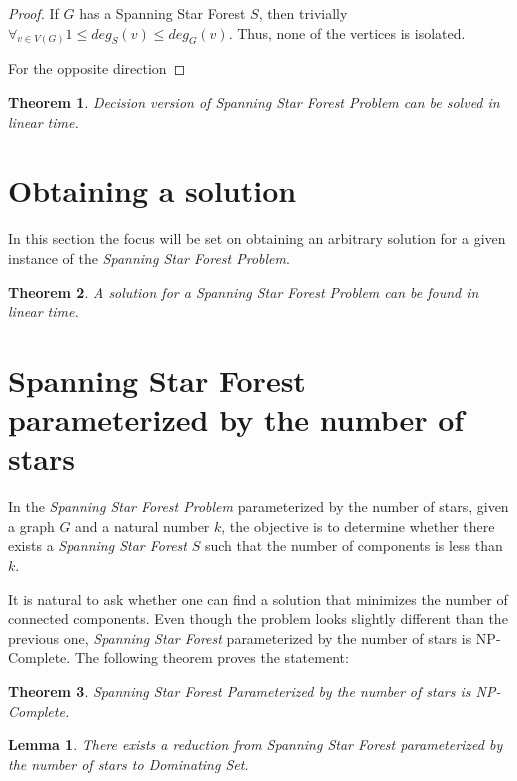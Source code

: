 \documentclass[en]{pracamgr}
\newtheorem{theorem}{Theorem}
\newtheorem{lemma}{Lemma}
\begin{document}
\begin{proof}
	If $G$ has a Spanning Star Forest $S$, then trivially 
	$\forall_{v \in V(G)} 1 \leq deg_S(v) \leq deg_G(v)$. Thus, none of the
	vertices is isolated.
	
	For the opposite direction
\end{proof}

\begin{theorem}
	Decision version of Spanning Star Forest Problem can be solved in linear
	time.
\end{theorem}

\section{Obtaining a solution}

In this section the focus will be set on obtaining an arbitrary solution for
a given instance of the \emph{Spanning Star Forest Problem}.

\begin{theorem}
	A solution for a Spanning Star Forest Problem can be found in linear time.
\end{theorem}

\section{Spanning Star Forest parameterized by the number of stars}

In the \emph{Spanning Star Forest Problem} parameterized by the number of
stars, given a graph $G$ and a natural number $k$, the objective is to
determine whether there exists a \emph{Spanning Star Forest} $S$ such that
the number of components is less than $k$.

It is natural to ask whether one can find a solution that minimizes the number
of connected components. Even though the problem looks slightly different
than the previous one, \emph{Spanning Star Forest} parameterized by the 
number of stars is NP-Complete. The following theorem proves the statement:

\begin{theorem}
	Spanning Star Forest Parameterized by the number of stars is NP-Complete.
\end{theorem}

\begin{lemma}
	There exists a reduction from Spanning Star Forest parameterized by the
	number of stars to Dominating Set.
\end{lemma}
\end{document}
